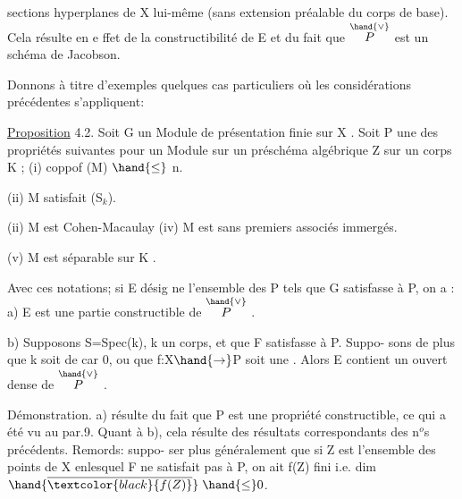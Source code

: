 
sections hyperplanes de X lui-même (sans extension préalable du corps
\margin{$\hand{\rightarrow}$}de base). Cela résulte en e ffet de la constructibilité de E et du fait
que $\overset{\hand{\vee}}{P}$ est un schéma de Jacobson.

Donnons à titre d'exemples quelques cas particuliers où les
considérations précédentes s'appliquent:

\uline{Proposition} 4.2. Soit G un Module de présentation finie sur X .
Soit P une des propriétés suivantes pour un Module sur un préschéma
algébrique Z sur un corps K ;
(i) coppof (M) $\hand{\leq}$ n.

(ii) M satisfait (S$_{k}$).

(ii) M est Cohen-Macaulay
(iv) M est sans  premiers associés immergés.

(v) M est séparable sur  K .


 Avec ces notations; si E désig%
ne l'ensemble des \hand{$\xi\in$} P tels que G\hand{$_{\xi}$} satisfasse à P, on a :
a) E est une partie constructible de $\overset{\hand{\vee}}{P}$ .

b) Supposons S=Spec(k), k un corps, et que F satisfasse à P. Suppo-%
sons de plus  que k soit de car 0, ou que f:X$\hand{\rightarrow}$P soit une . 
Alors E contient un ouvert dense de $\overset{\hand{\vee}}{P}$ .

Démonstration. a) résulte du fait que P est une propriété
constructible, ce qui a été vu au par.9. Quant à b), cela résulte
des résultats correspondants des  n$^{o}$s précédents. Remords: suppo-%
ser plus généralement que si Z est l'ensemble des points de X enlesquel%
F ne satisfait pas à P, on ait f(Z) fini i.e. dim $\hand{\overline{\textcolor{black}{f(Z)}}}\;\hand{\leq}0$.


